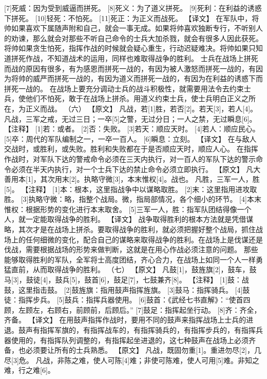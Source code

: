 \documentclass[a4paper,12pt,UTF8,twoside]{ctexbook}
\begin{document}
[7]死威：因为受到威逼而拼死。
[8]死义：为了道义拼死。
[9]死利：在利益的诱惑下拼死。
[10]轻死：不怕死。
[11]死正：为正义而战死。
【译文】
在军队中，将帅如果喜欢下属随声附和自己，就会一事无成。如果将帅喜欢独断专行，不听别人的劝谏，那么就会对那些不听自己命令的士兵大加杀戮，就会有很多人因此获死。将帅如果贪生怕死，指挥作战的时候就会疑心重生，行动迟疑难决。将帅如果只知道拼死作战，不知道战术的运用，同样也难取得战争的胜利。
士兵在战场上拼死而战的原因有很多，有为感恩而拼死一战的，有因为被人激怒而拼死一战的，有因为将帅的威严而拼死一战的，有因为道义而拼死一战的，有因为在利益的诱惑下而拼死一战的。
在战场上要充分调动士兵的战斗积极性，就需要用法令去约束士兵，使他们不怕死，敢于在战场上拼杀。用道义约束士兵，使士兵明白正义之所在，为正义而战。
（六）
【原文】
凡战，若[1]胜，若否[2]。若天[3]，若人[4]。
凡战，三军之戒，无过三日；一卒[5]之警，无过分日；一人之禁，无过瞬息[6]。
【注释】
[1]若：或者。
[2]否：失败。
[3]若天：顺应天时。
[4]若人：顺应民心。
[5]卒：周代的军队编制之一，一卒一百人。
[6]瞬息：立刻。
【译文】
在与敌人交战时，或胜利，或失败。胜利和失败都在于是否顺应天时，顺应人心。
在指挥作战时，对军队下达的警戒命令必须在三天内执行，对一百人的军队下达的警示命令必须在半天内执行，对一个士兵下达的禁止命令必须立即执行。
【原文】
凡大善用本[1]，其次用末[2]。执略守微[3]，本末惟权[4]。战也。
凡胜，三军一人，胜[5]。
【注释】
[1]本：根本，这里指战争中以谋略取胜。
[2]末：这里指用进攻取胜。
[3]执略守微：略，指整个战局。微，指局部情况，各个细小的环节。
[4]本末惟权：根据形势的变化进行本末取舍。
[5]三军一人，胜：指军队团结得像一个人，就一定能取得战争的胜利。
【译文】
战争取得胜利的根本方法就是凭借谋略，其次才是在战场上拼杀。要取得战争的胜利，就必须把握好整个战局，抓住战场上的任何细微的变化，配合自己的谋略来取得战争的胜利。在战场上是伐谋还是伐战，需要根据战场的形势来做判断，这就是在用心作战必须注意的问题。
那些能够取得胜利的军队，全军将士高度团结，齐心合力，在战场上如同一个人一样勇猛直前，从而取得战争的胜利。
（七）
【原文】
凡鼓[1]，鼓旌旗[2]，鼓车，鼓马[3]，鼓徒[4]，鼓兵[5]，鼓首[6]，鼓足[7]，七鼓兼齐[8]。
【注释】
[1]鼓：战鼓，这里指击鼓。
[2]鼓旌旗：指用鼓声指挥旌旗。
[3]鼓马：指挥骑兵。
[4]鼓徒：指挥步兵。
[5]鼓兵：指挥兵器使用。
[6]鼓首：《武经七书直解》：“使首四顾，左顾左，右顾右，前顾前，后顾后。”
[7]鼓足：指挥起坐行动。
[8]齐：齐全，齐备。
【译文】
在用鼓声指挥作战时，要用不同的鼓声来指挥战场上士兵的进退。鼓声有指挥军旗的，有指挥战车的，有指挥骑兵的，有指挥步兵的，有指挥兵器使用的，有指挥队列调整的，有指挥起坐进退的，这七种鼓声在战场上必须齐备，也必须要让所有的士兵熟悉。
【原文】
凡战，既固勿重[1]。重进勿尽[2]，几尽[3]危。
凡战，非陈之难，使人可陈[4]难；非使可陈难，使人可用[5]难。非知之难，行之难[6]。
\end{document}
